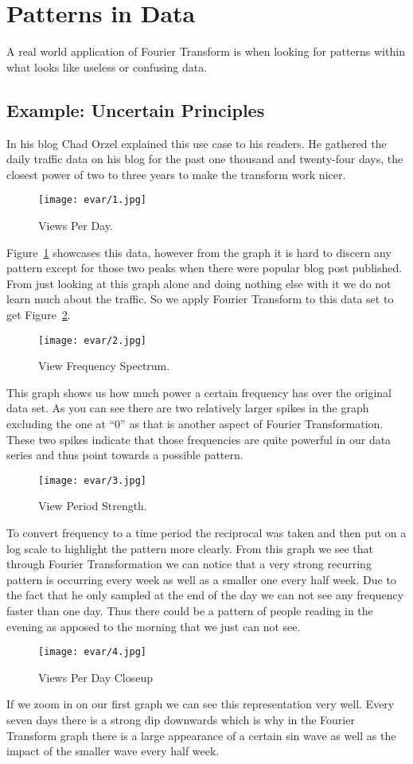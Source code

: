 \documentclass [../article.tex]{subfiles}
\begin{document}
  \section{Patterns in Data}
  A real world application of Fourier Transform is when
  looking for patterns within what looks like useless or
  confusing data. 
  \subsection{Example: Uncertain Principles}
  In his blog Chad Orzel explained this use
  case to his readers. He gathered the daily traffic data on his
  blog for the past one thousand and twenty-four days, the closest
  power of two to three years to make the transform work nicer.
  \begin{figure}[htbp]
    \texttt{[image: evar/1.jpg]}
    \caption{Views Per Day.}
    \label{fig:views}
  \end{figure}
  Figure~\ref{fig:views} showcases this data, however from the
  graph it is hard to discern any pattern except for those two peaks 
  when there were popular blog post published. 
  From just looking at this graph
  alone and doing nothing else with it we do not learn much
  about the traffic. So we apply Fourier Transform to this
  data set to get Figure~\ref{fig:viewfreq}.
  \begin{figure}[htbp]
    \texttt{[image: evar/2.jpg]}
    \caption{View Frequency Spectrum.}
    \label{fig:viewfreq}
  \end{figure}
  This graph shows us how much power a certain frequency has over
  the original data set. As you can see there are two relatively 
  larger spikes in the graph excluding the one at ``0'' as that is 
  another aspect of Fourier Transformation. These two spikes indicate
  that those frequencies are quite powerful in our data series and thus
  point towards a possible pattern.
  \begin{figure}[htbp]
    \texttt{[image: evar/3.jpg]}
    \caption{View Period Strength.}
    \label{fig:viewperiods}
  \end{figure}
  To convert frequency to a time period the reciprocal was taken and then
  put on a log scale to highlight the pattern more clearly. From this graph 
  we see that through Fourier Transformation we can notice that a very
  strong recurring pattern is occurring every week as well as a
  smaller one every half week. Due to the fact that he only sampled
  at the end of the day we can not see any frequency faster than one
  day. Thus there could be a pattern of people reading in the evening as 
  apposed to the morning that we just can not see.
  \begin{figure}[htbp]
    \texttt{[image: evar/4.jpg]}
    \caption{Views Per Day Closeup}
    \label{fig:viewcloseup}
  \end{figure}
  If we zoom in on our first graph we can see this representation very
  well. Every seven days there is a strong dip downwards  which is
  why in the Fourier Transform graph there is a large appearance of
  a certain sin wave as well as the impact of the smaller wave every
  half week.
\end{document}
